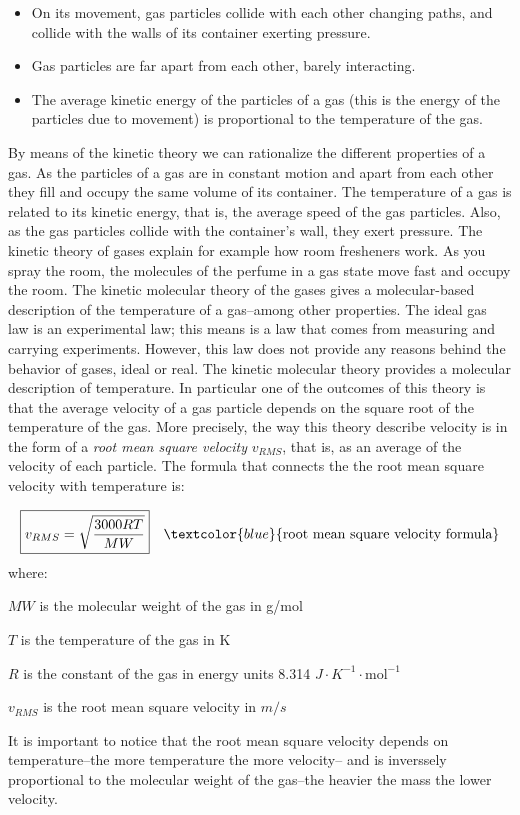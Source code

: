 \documentclass[main.tex]{subfiles}
\begin{document}
\begin{description}
\begin{itemize}
\item On its movement, gas particles collide with each other changing paths, and collide with the walls of its container exerting pressure.
\item  Gas particles are far apart from each other, barely interacting.
\item The average kinetic energy of the particles of a gas (this is the energy of the particles due to movement) is proportional to the temperature of the gas.
\end{itemize}
By means of the kinetic theory we can rationalize the different properties of a gas. As the particles of a gas are in constant motion and apart from each other they fill and occupy the same volume of its container. The temperature of a gas is related to its kinetic energy, that is, the average speed of the gas particles. Also, as the gas particles collide with the container's wall, they exert pressure. The kinetic theory of gases explain for example how room fresheners work. As you spray the room, the molecules of the perfume in a gas state move fast and occupy the room.
The kinetic molecular theory of the gases gives a molecular-based description of the temperature of a gas--among other properties. The ideal gas law is an experimental law; this means is a law that comes from measuring and carrying experiments. However, this law does not provide any reasons behind the behavior of gases, ideal or real. The kinetic molecular theory provides a molecular description of temperature. In particular one of the outcomes of this theory is that the average velocity of a gas particle depends on the square root of the temperature of the gas. More precisely, the way this theory describe velocity is in the form of a \emph{root mean square velocity} $v_{RMS}$, that is, as an average of the velocity of each particle. The formula that connects the the root mean square velocity with temperature is:

\begin{equation*}\begin{split}
\boxed{  v_{RMS}=\sqrt{   \frac{3000RT}{MW} }   } \quad \textcolor{blue}{\text{root mean square velocity formula}}
\end{split}\end{equation*}
where:
\begin{where}
 \item $MW$   is the molecular weight of the gas in g/mol
\item $T$   is the temperature of the gas in K
\item $R$   is the constant of the gas in energy units 8.314 $J\cdot K^{-1}\cdot \text{mol}^{-1} $
\item $v_{RMS}$ is the root mean square velocity in $m/s$
\end{where}
It is important to notice that the root mean square velocity depends on temperature--the more temperature the more velocity-- and is inverssely proportional to the molecular weight of the gas--the heavier the mass the lower velocity.



\end{description}
\end{document}
